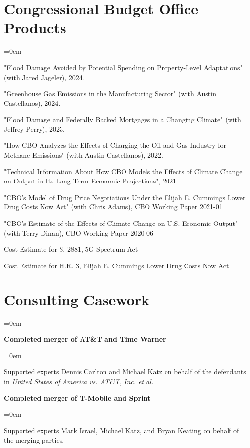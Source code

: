 \documentclass[letterpaper]{article}
\renewenvironment{itemize}{
  \vspace{-0.5em}
  \begin{list}{}{
	\itemsep=0em
    \setlength{\leftmargin}{1.5em}
  }
}{
  \end{list}
}
\begin{document}
\section*{Congressional Budget Office Products}
\begin{itemize}
\item "Flood Damage Avoided by Potential Spending on Property-Level Adaptations" (with Jared Jageler), 2024.
\item "Greenhouse Gas Emissions in the Manufacturing Sector" (with Austin Castellanos), 2024.
\item "Flood Damage and Federally Backed Mortgages in a Changing Climate" (with Jeffrey Perry), 2023.
\item "How CBO Analyzes the Effects of Charging the Oil and Gas Industry for Methane Emissions" (with Austin Castellanos), 2022.
\item "Technical Information About How CBO Models the Effects of Climate Change on Output in Its Long-Term Economic Projections", 2021.
\item "CBO’s Model of Drug Price Negotiations Under the Elijah E. Cummings Lower Drug Costs Now Act" (with Chris Adams), CBO Working Paper 2021-01
\item "CBO’s Estimate of the Effects of Climate Change on U.S. Economic Output" (with Terry Dinan), CBO Working Paper 2020-06
\item Cost Estimate for S. 2881, 5G Spectrum Act
\item Cost Estimate for H.R. 3, Elijah E. Cummings Lower Drug Costs Now Act
\end{itemize}

\section*{Consulting Casework}
\begin{itemize}
\item \textbf{Completed merger of AT\&T and Time Warner}
\begin{itemize}
\item Supported experts Dennis Carlton and Michael Katz on behalf of the defendants in \textit{United States of America vs. AT\&T, Inc. et al.}
\end{itemize}
\item \textbf{Completed merger of T-Mobile and Sprint}
\begin{itemize}
\item Supported experts Mark Israel, Michael Katz, and Bryan Keating on behalf of the merging parties.
\end{itemize}
\end{itemize}
\end{document}

